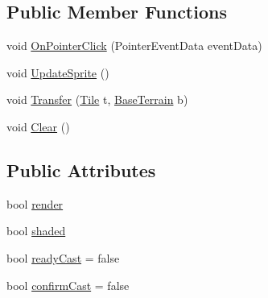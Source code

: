 \subsection*{Public Member Functions}
\begin{DoxyCompactItemize}
\item 
void \mbox{\hyperlink{class_terrain_behaviour_a81acf1d578876b7a0870fdb0880c52a9}{On\+Pointer\+Click}} (Pointer\+Event\+Data event\+Data)
\item 
void \mbox{\hyperlink{class_terrain_behaviour_a1f1234296c90b45abf0ad3ee6f9e78ac}{Update\+Sprite}} ()
\item 
void \mbox{\hyperlink{class_terrain_behaviour_a97b6323eafb1c26361878bb1d37f4556}{Transfer}} (\mbox{\hyperlink{class_tile}{Tile}} t, \mbox{\hyperlink{class_base_terrain}{Base\+Terrain}} b)
\item 
void \mbox{\hyperlink{class_terrain_behaviour_a23ffdd00ac2a41293dff38496a09663d}{Clear}} ()
\end{DoxyCompactItemize}
\subsection*{Public Attributes}
\begin{DoxyCompactItemize}
\item 
bool \mbox{\hyperlink{class_terrain_behaviour_a808f5cfaa6bd348c1ced34fe54912fce}{render}}
\item 
bool \mbox{\hyperlink{class_terrain_behaviour_a86097f3ce0a37390f44790a794e37144}{shaded}}
\item 
bool \mbox{\hyperlink{class_terrain_behaviour_a31d1471342a45dcdc36a0c0f78680d0f}{ready\+Cast}} = false
\item 
bool \mbox{\hyperlink{class_terrain_behaviour_a36547c4343110b97274e7c3c8d3b5ff2}{confirm\+Cast}} = false
\end{DoxyCompactItemize}
